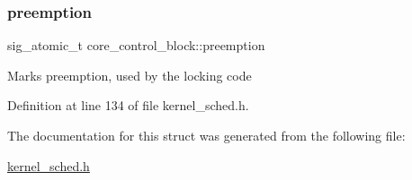\subsubsection{\texorpdfstring{preemption}{preemption}}
{\footnotesize\ttfamily sig\+\_\+atomic\+\_\+t core\+\_\+control\+\_\+block\+::preemption}

Marks preemption, used by the locking code 

Definition at line 134 of file kernel\+\_\+sched.\+h.



The documentation for this struct was generated from the following file\+:\begin{DoxyCompactItemize}
\item 
\hyperlink{kernel__sched_8h}{kernel\+\_\+sched.\+h}\end{DoxyCompactItemize}
